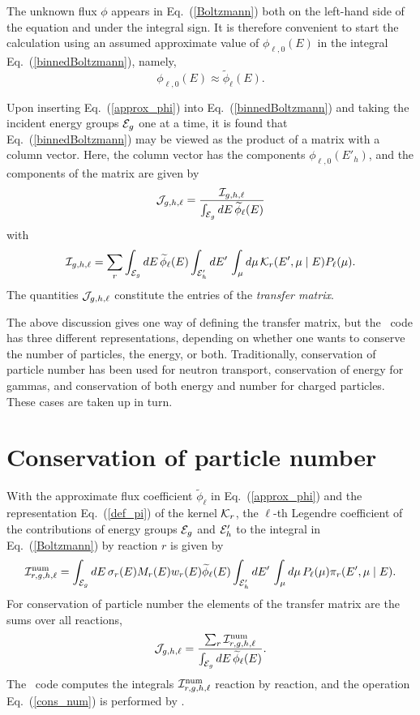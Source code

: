 The unknown flux $\phi$ appears in Eq.~(\ref{Boltzmann})
both on the left-hand side of the equation and under
the integral sign.  It is therefore convenient to
start the calculation using an assumed approximate value of
$\phi_{\ell, 0}(E)$ in the integral Eq.~(\ref{binnedBoltzmann}), namely,
\begin{equation}
  \phi_{\ell, 0}(E) \approx
    \widetilde\phi_{\ell}(E).
  \label{approx_phi}
\end{equation}

Upon inserting Eq.~(\ref{approx_phi}) into Eq.~(\ref{binnedBoltzmann})
and taking the incident energy groups ${\cal E}_g$ one at a time,
it is found that Eq.~(\ref{binnedBoltzmann}) may be viewed as the product
of a matrix with a column vector.  Here, the column vector has the
components $\phi_{\ell, 0}(E'_h)$, and the components of the matrix
are given by
$$
  {\cal J}_{g,h,\ell} = \frac{ {\cal I}_{g,h,\ell} }
       { \int_{{\cal E}_g} dE \, \widetilde \phi_\ell(E) }
$$
with
$$
    {\cal I}_{g,h,\ell} = \sum_r
     \int_{{\cal E}_g} dE \, \widetilde \phi_\ell(E) 
    \int_{{\cal E}'_h } dE' \, \int_\mu d\mu \, 
     {\cal K}_r(E', \mu \mid E) P_\ell( \mu ).
$$
The quantities ${\cal J}_{g,h,\ell}$ constitute the entries of the \textit{transfer matrix}.

The above discussion gives one way of defining the transfer matrix,
but the \xndfgen\ code has three
different representations, depending
on whether one wants to conserve the number of particles,
the energy, or both.  Traditionally, conservation of particle 
number has been used for neutron transport, conservation of energy
for gammas, and conservation of both energy and number for
charged particles.  These cases are taken up in turn.

\section{Conservation of particle number}
With the approximate flux coefficient $\widetilde\phi_\ell$ in Eq.~(\ref{approx_phi})
and the representation Eq.~(\ref{def_pi}) of the kernel ${\cal K}_r$, the
$\ell$-th Legendre coefficient of the contributions of energy
groups ${\cal E}_g$ and ${\cal E}'_h$ to the integral
in Eq.~(\ref{Boltzmann}) by reaction $r$ is given by
\begin{equation}
  {\cal I}^{\text{num}}_{r,g,h,\ell} =
     \int_{{\cal E}_g} dE \, \sigma_r ( E ) M_r(E) w_r(E) \widetilde \phi_\ell(E) 
    \int_{{\cal E}'_h } dE' \, \int_\mu d\mu \, 
     P_\ell( \mu )
     \pi_r(E', \mu \mid E).
  \label{Inum}
\end{equation}
For conservation of particle number the elements of the transfer matrix
are the sums over all reactions,
\begin{equation}
  {\cal J}_{g,h,\ell} = \frac{ \sum_r {\cal I}^{\text{num}}_{r,g,h,\ell} }
       { \int_{{\cal E}_g} dE \, \widetilde \phi_\ell(E) }.
  \label{cons_num}
\end{equation}
The \gettransfer\ code computes the integrals ${\cal I}^{\text{num}}_{r,g,h,\ell}$
reaction by reaction, and the operation Eq.~(\ref{cons_num}) is performed
by \xndfgen.

